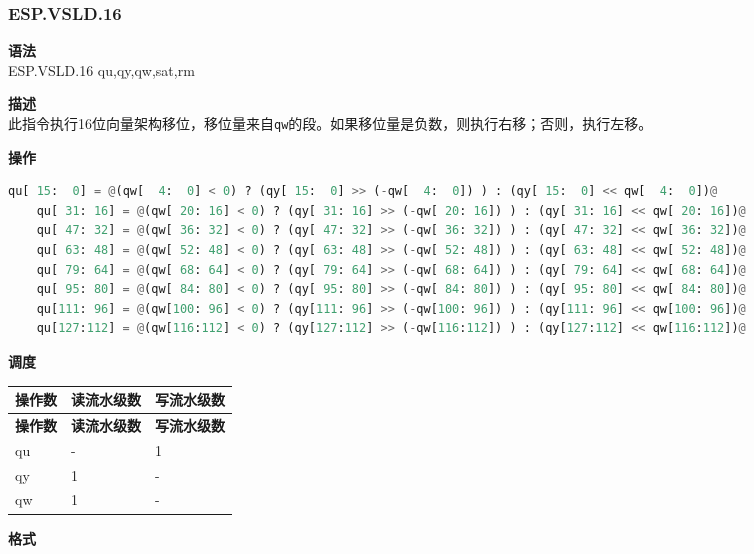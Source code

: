 \newpage

\newpage
\subsubsection{ESP.VSLD.16}\label{instruction:ESPVSLD16}
\textbf{语法}\\
ESP.VSLD.16 qu,qy,qw,sat,rm

\textbf{描述}\\
此指令执行16位向量架构移位，移位量来自\lstinline{qw}的段。如果移位量是负数，则执行右移；否则，执行左移。

\textbf{操作}\\
\begin{lstlisting}[language=Python, escapechar=@]
    qu[ 15:  0] = @(qw[  4:  0] < 0) ? (qy[ 15:  0] >> (-qw[  4:  0]) ) : (qy[ 15:  0] << qw[  4:  0])@
    qu[ 31: 16] = @(qw[ 20: 16] < 0) ? (qy[ 31: 16] >> (-qw[ 20: 16]) ) : (qy[ 31: 16] << qw[ 20: 16])@
    qu[ 47: 32] = @(qw[ 36: 32] < 0) ? (qy[ 47: 32] >> (-qw[ 36: 32]) ) : (qy[ 47: 32] << qw[ 36: 32])@
    qu[ 63: 48] = @(qw[ 52: 48] < 0) ? (qy[ 63: 48] >> (-qw[ 52: 48]) ) : (qy[ 63: 48] << qw[ 52: 48])@
    qu[ 79: 64] = @(qw[ 68: 64] < 0) ? (qy[ 79: 64] >> (-qw[ 68: 64]) ) : (qy[ 79: 64] << qw[ 68: 64])@
    qu[ 95: 80] = @(qw[ 84: 80] < 0) ? (qy[ 95: 80] >> (-qw[ 84: 80]) ) : (qy[ 95: 80] << qw[ 84: 80])@
    qu[111: 96] = @(qw[100: 96] < 0) ? (qy[111: 96] >> (-qw[100: 96]) ) : (qy[111: 96] << qw[100: 96])@
    qu[127:112] = @(qw[116:112] < 0) ? (qy[127:112] >> (-qw[116:112]) ) : (qy[127:112] << qw[116:112])@

\end{lstlisting}

\textbf{调度}\\
\begin{longtable}[c]{|l|l|l|}
    \hline
    \rowcolor{lightgray}
    \textbf{操作数} & \textbf{读流水级数} & \textbf{写流水级数} \\\hline
    \endfirsthead
    \hline
    \rowcolor{lightgray}
     \textbf{操作数} & \textbf{读流水级数} & \textbf{写流水级数} \\\hline
    \endhead
    \hline
    \endfoot

  qu & - & 1 \\\hline
  qy & 1 & - \\\hline
  qw & 1 & -

\end{longtable}

\textbf{格式}\\

